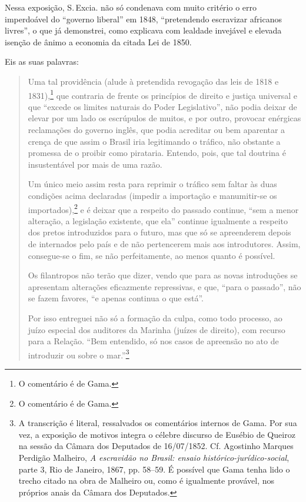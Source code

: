 Nessa exposição, S.\,Excia. não só condenava com muito critério o erro
imperdoável do ``governo liberal'' em 1848, ``pretendendo escravizar
africanos livres'', o que já demonstrei, como explicava com lealdade
invejável e elevada isenção de ânimo a economia da citada Lei de 1850.

Eis as suas palavras:

\begin{quote}
Uma tal providência (alude à pretendida revogação das leis de 1818 e
1831),\footnote{O comentário é de Gama.} que contraria de frente os
princípios de direito e justiça universal e que ``excede os limites
naturais do Poder Legislativo'', não podia deixar de elevar por um lado
os escrúpulos de muitos, e por outro, provocar enérgicas reclamações do
governo inglês, que podia acreditar ou bem aparentar a crença de que
assim o Brasil iria legitimando o tráfico, não obstante a promessa de o
proibir como pirataria. Entendo, pois, que tal doutrina é insustentável
por mais de uma razão.

Um único meio assim resta para reprimir o tráfico sem faltar às duas
condições acima declaradas (impedir a importação e manumitir-se os
importados),\footnote{O comentário é de Gama.} e é deixar que a
respeito do passado continue, ``sem a menor alteração, a legislação
existente, que ela'' continue igualmente a respeito dos pretos
introduzidos para o futuro, mas que só se apreenderem depois de
internados pelo país e de não pertencerem mais aos introdutores. Assim,
consegue-se o fim, se não perfeitamente, ao menos quanto é possível.

\noindent\dotfill{}

Os filantropos não terão que dizer, vendo que para as novas introduções
se apresentam alterações eficazmente repressivas, e que, ``para o
passado'', não se fazem favores, ``e apenas continua o que está''.

\noindent\dotfill{}

Por isso entreguei não só a formação da culpa, como todo processo, ao
juízo especial dos auditores da Marinha (juízes de direito), com recurso
para a Relação. ``Bem entendido, só nos casos de apreensão no ato de
introduzir ou sobre o mar.''\footnote{A transcrição é literal,
  ressalvados os comentários internos de Gama. Por sua vez, a exposição
  de motivos integra o célebre discurso de Eusébio de Queiroz na sessão
  da Câmara dos Deputados de 16/07/1852. Cf. Agostinho Marques Perdigão
Malheiro, \emph{A escravidão no Brasil: ensaio histórico-jurídico-social},
parte 3, Rio de Janeiro, 1867, pp. 58--59. É possível que Gama tenha lido o trecho
  citado na obra de Malheiro ou, como é igualmente provável, nos
  próprios anais da Câmara dos Deputados.}
\end{quote}  


